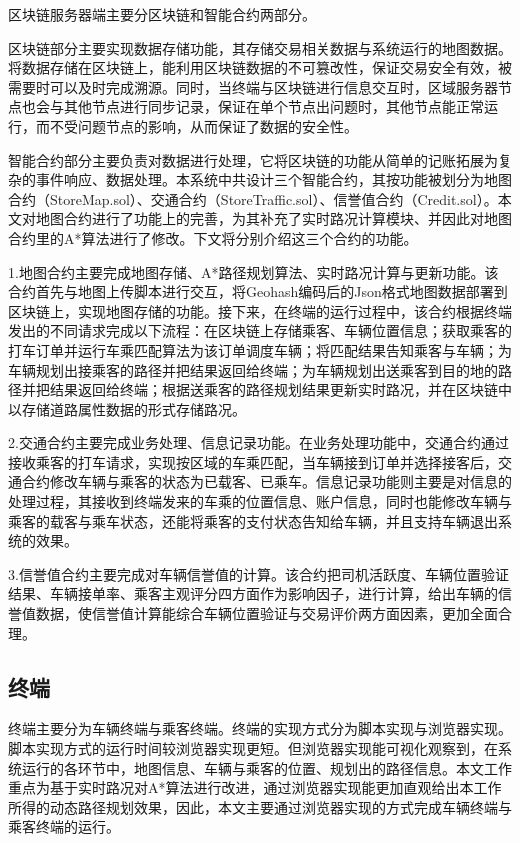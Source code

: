 区块链服务器端主要分区块链和智能合约两部分。

区块链部分主要实现数据存储功能，其存储交易相关数据与系统运行的地图数据。将数据存储在区块链上，能利用区块链数据的不可篡改性，保证交易安全有效，被需要时可以及时完成溯源。同时，当终端与区块链进行信息交互时，区域服务器节点也会与其他节点进行同步记录，保证在单个节点出问题时，其他节点能正常运行，而不受问题节点的影响，从而保证了数据的安全性。

智能合约部分主要负责对数据进行处理，它将区块链的功能从简单的记账拓展为复杂的事件响应、数据处理。本系统中共设计三个智能合约，其按功能被划分为地图合约（StoreMap.sol）、交通合约（StoreTraffic.sol）、信誉值合约（Credit.sol）。本文对地图合约进行了功能上的完善，为其补充了实时路况计算模块、并因此对地图合约里的A*算法进行了修改。下文将分别介绍这三个合约的功能。

1.地图合约主要完成地图存储、A*路径规划算法、实时路况计算与更新功能。该合约首先与地图上传脚本进行交互，将Geohash编码后的Json格式地图数据部署到区块链上，实现地图存储的功能。接下来，在终端的运行过程中，该合约根据终端发出的不同请求完成以下流程：在区块链上存储乘客、车辆位置信息；获取乘客的打车订单并运行车乘匹配算法为该订单调度车辆；将匹配结果告知乘客与车辆；为车辆规划出接乘客的路径并把结果返回给终端；为车辆规划出送乘客到目的地的路径并把结果返回给终端；根据送乘客的路径规划结果更新实时路况，并在区块链中以存储道路属性数据的形式存储路况。

2.交通合约主要完成业务处理、信息记录功能。在业务处理功能中，交通合约通过接收乘客的打车请求，实现按区域的车乘匹配，当车辆接到订单并选择接客后，交通合约修改车辆与乘客的状态为已载客、已乘车。信息记录功能则主要是对信息的处理过程，其接收到终端发来的车乘的位置信息、账户信息，同时也能修改车辆与乘客的载客与乘车状态，还能将乘客的支付状态告知给车辆，并且支持车辆退出系统的效果。

3.信誉值合约主要完成对车辆信誉值的计算。该合约把司机活跃度、车辆位置验证结果、车辆接单率、乘客主观评分四方面作为影响因子，进行计算，给出车辆的信誉值数据，使信誉值计算能综合车辆位置验证与交易评价两方面因素，更加全面合理。

\subsection{终端}

终端主要分为车辆终端与乘客终端。终端的实现方式分为脚本实现与浏览器实现。脚本实现方式的运行时间较浏览器实现更短。但浏览器实现能可视化观察到，在系统运行的各环节中，地图信息、车辆与乘客的位置、规划出的路径信息。本文工作重点为基于实时路况对A*算法进行改进，通过浏览器实现能更加直观给出本工作所得的动态路径规划效果，因此，本文主要通过浏览器实现的方式完成车辆终端与乘客终端的运行。

